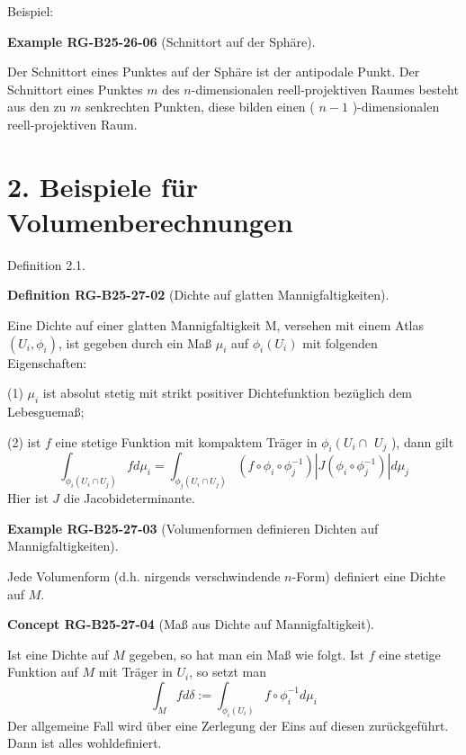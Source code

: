 \documentclass[10pt, letterpaper]{article}
\newcommand{\CustomHeading}[3]{%
  \par\medskip\noindent%
  \textbf{#1 #2} \textnormal{(#3)}.\enskip%
}
\newenvironment{DEF}[2]{\begin{unitbox}\CustomHeading{Definition}{#1}{#2}}{\end{unitbox}}
\newenvironment{EXA}[2]{\begin{unitbox}\CustomHeading{Example}{#1}{#2}}{\end{unitbox}}
\newenvironment{CONC}[2]{\begin{unitbox}\CustomHeading{Concept}{#1}{#2}}{\end{unitbox}}
\begin{document}
Beispiel:

\begin{EXA}{RG-B25-26-06}{Schnittort auf der Sphäre}
Der Schnittort eines Punktes auf der Sphäre ist der antipodale Punkt. Der Schnittort eines Punktes $m$ des $n$-dimensionalen reell-projektiven Raumes besteht aus den zu $m$ senkrechten Punkten, diese bilden einen ( $n-1$ )-dimensionalen reell-projektiven Raum.
\end{EXA}



\section*{2. Beispiele für Volumenberechnungen}



Definition 2.1. 


\begin{DEF}{RG-B25-27-02}{Dichte auf glatten Mannigfaltigkeiten}
Eine Dichte auf einer glatten Mannigfaltigkeit M, versehen mit einem Atlas $\left(U_{i}, \phi_{i}\right)$, ist gegeben durch ein Maß $\mu_{i}$ auf $\phi_{i}\left(U_{i}\right)$ mit folgenden Eigenschaften:

(1) $\mu_{i}$ ist absolut stetig mit strikt positiver Dichtefunktion bezüglich dem Lebesguemaß;

(2) ist $f$ eine stetige Funktion mit kompaktem Träger in $\phi_{i}\left(U_{i} \cap\right.$ $U_{j}$ ), dann gilt
$$
\int_{\phi_{i}\left(U_{i} \cap U_{j}\right)} f d \mu_{i}=\int_{\phi_{j}\left(U_{i} \cap U_{j}\right)}\left(f \circ \phi_{i} \circ \phi_{j}^{-1}\right)\left|J\left(\phi_{i} \circ \phi_{j}^{-1}\right)\right| d \mu_{j}
$$
Hier ist $J$ die Jacobideterminante.
\end{DEF}

\begin{EXA}{RG-B25-27-03}{Volumenformen definieren Dichten auf Mannigfaltigkeiten}
Jede Volumenform (d.h. nirgends verschwindende $n$-Form) definiert eine Dichte auf $M$.
\end{EXA}



\begin{CONC}{RG-B25-27-04}{Maß aus Dichte auf Mannigfaltigkeit}
Ist eine Dichte auf $M$ gegeben, so hat man ein Maß wie folgt. Ist $f$ eine stetige Funktion auf $M$ mit Träger in $U_{i}$, so setzt man
$$
\int_{M} f d \delta:=\int_{\phi_{i}\left(U_{i}\right)} f \circ \phi_{i}^{-1} d \mu_{i}
$$
Der allgemeine Fall wird über eine Zerlegung der Eins auf diesen zurückgeführt. Dann ist alles wohldefiniert.
\end{CONC}
\end{document}
